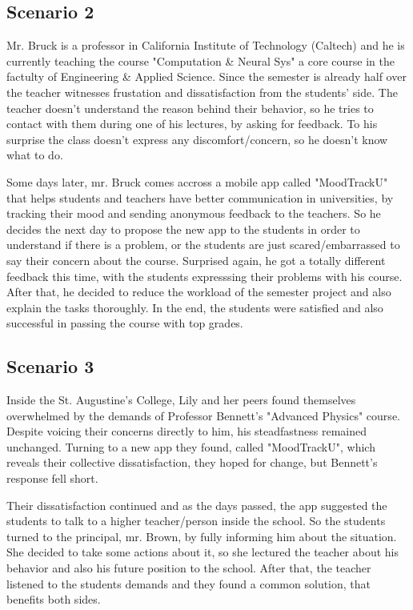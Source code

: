 \documentclass[11pt]{report}
\begin{document}
\subsection{Scenario 2}

Mr. Bruck is a professor in California Institute of Technology (Caltech) and he is currently teaching the course "Computation \& Neural Sys" a core course in the factulty of Engineering \& Applied Science. Since the semester is already half over the teacher witnesses frustation and dissatisfaction from the students' side. The teacher doesn't understand the reason behind their behavior, so he tries to contact with them during one of his lectures, by asking for feedback. To his surprise the class doesn't express any discomfort/concern, so he doesn't know what to do.
\newline

\noindent Some days later, mr. Bruck comes accross a mobile app called "MoodTrackU" that helps students and teachers have better communication in universities, by tracking their mood and sending anonymous feedback to the teachers. So he decides the next day to propose the new app to the students in order to understand if there is a problem, or the students are just scared/embarrassed to say their concern about the course. Surprised again, he got a totally different feedback this time, with the students expresssing their problems with his course. After that, he decided to reduce the workload of the semester project and also explain the tasks thoroughly. In the end, the students were satisfied and also successful in passing the course with top grades.

\subsection{Scenario 3}

Inside the St. Augustine’s College, Lily and her peers found themselves overwhelmed by the demands of Professor Bennett's "Advanced Physics" course. Despite voicing their concerns directly to him, his steadfastness remained unchanged. Turning to a new app they found, called "MoodTrackU", which reveals their collective dissatisfaction, they hoped for change, but Bennett's response fell short.
\newline

\noindent Their dissatisfaction continued and as the days passed, the app suggested the students to talk to a higher teacher/person inside the school. So the students turned to the principal, mr. Brown, by fully informing him about the situation. She decided to take some actions about it, so she lectured the teacher about his behavior and also his future position to the school. After that, the teacher listened to the students demands and they found a common solution, that benefits both sides. 
\end{document}
